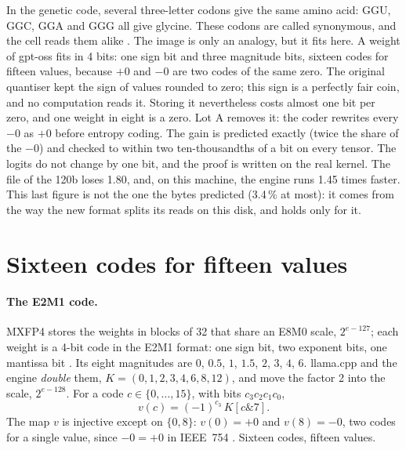 \begin{enbref}
In the genetic code, several three-letter codons give the same amino acid: GGU, GGC, GGA and GGG all give glycine. These codons are called synonymous, and the cell reads them alike \parencite{genome-crick1968,genome-pe-crick1966wobble}. The image is only an analogy, but it fits here. A weight of gpt-oss fits in 4 bits: one sign bit and three magnitude bits, sixteen codes for fifteen values, because $+0$ and $-0$ are two codes of the same zero. The original quantiser kept the sign of values rounded to zero; this sign is a perfectly fair coin, and no computation reads it. Storing it nevertheless costs almost one bit per zero, and one weight in eight is a zero. Lot A removes it: the coder rewrites every $-0$ as $+0$ before entropy coding. The gain is predicted exactly (twice the share of the $-0$) and checked to within two ten-thousandths of a bit on every tensor. The logits do not change by one bit, and the proof is written on the real kernel. The file of the 120b loses \SI{1.80}{\Go}, and, on this machine, the engine runs 1.45 times faster. This last figure is not the one the bytes predicted (3.4\,\% at most): it comes from the way the new format splits its reads on this disk, and holds only for it.
\end{enbref}

\section{Sixteen codes for fifteen values}\label{t3cod:sec:codes}

\paragraph{The E2M1 code.} MXFP4 stores the weights in blocks of 32 that share an E8M0 scale, $2^{e - 127}$; each weight is a 4-bit code in the E2M1 format: one sign bit, two exponent bits, one mantissa bit \parencite{ocpmx2023,rouhani2023microscaling}. Its eight magnitudes are $0$, $0.5$, $1$, $1.5$, $2$, $3$, $4$, $6$. llama.cpp and the engine \emph{double} them, $K = (0, 1, 2, 3, 4, 6, 8, 12)$, and move the factor 2 into the scale, $2^{e - 128}$. For a code $c \in \{0, \dots, 15\}$, with bits $c_3 c_2 c_1 c_0$,
\begin{equation}\label{t3cod:eq:valeur}
v(c) = (-1)^{c_3}\, K[c \mathbin{\&} 7].
\end{equation}
The map $v$ is injective except on $\{0, 8\}$: $v(0) = +0$ and $v(8) = -0$, two codes for a single value, since $-0 = +0$ in IEEE~754 \parencite{ieee754}. Sixteen codes, fifteen values.


